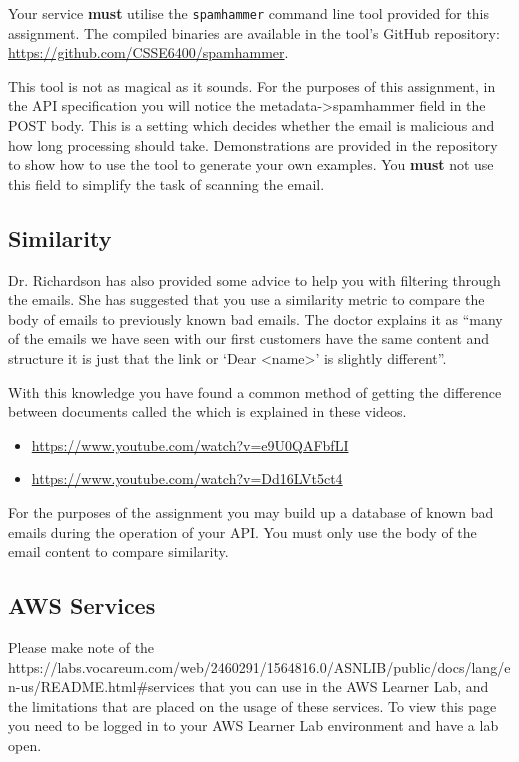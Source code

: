 \documentclass{csse4400}
\begin{document}
Your service \textbf{must} utilise the \texttt{spamhammer} command line tool provided for this assignment.
The compiled binaries are available in the tool's GitHub repository: \url{https://github.com/CSSE6400/spamhammer}.


This tool is not as magical as it sounds.
For the purposes of this assignment, in the API specification you will notice the metadata->spamhammer field in the POST body.
This is a setting which decides whether the email is malicious and how long processing should take.
Demonstrations are provided in the repository to show how to use the tool to generate your own examples.
You \textbf{must} not use this field to simplify the task of scanning the email.

\subsection{Similarity}

Dr. Richardson has also provided some advice to help you with filtering through the emails.
She has suggested that you use a similarity metric to compare the body of emails to previously known bad emails.
The doctor explains it as ``many of the emails we have seen with our first customers have the same content and structure it is just that the link or `Dear <name>' is slightly different''.

With this knowledge you have found a common method of getting the difference between documents called the 
 which is explained in these videos.

\begin{itemize}
  \item \url{https://www.youtube.com/watch?v=e9U0QAFbfLI}
  \item \url{https://www.youtube.com/watch?v=Dd16LVt5ct4}
\end{itemize}

For the purposes of the assignment you may build up a database of known bad emails during the operation of your API. You must only use the body of the email content to compare similarity.


\subsection{AWS Services}
Please make note of the 
{https://labs.vocareum.com/web/2460291/1564816.0/ASNLIB/public/docs/lang/en-us/README.html\#services}
that you can use in the AWS Learner Lab, and the limitations that are placed on the usage of these services.
To view this page you need to be logged in to your AWS Learner Lab environment and have a lab open.
\end{document}
